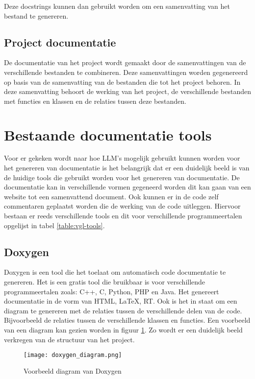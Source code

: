 Deze docstrings kunnen dan gebruikt worden om een samenvatting van het bestand te genereren.

\subsection{Project documentatie}
\label{sec:project-documentatie-literatuur}
De documentatie van het project wordt gemaakt door de samenvattingen van de verschillende bestanden te combineren.
Deze samenvattingen worden gegenereerd op basis van de samenvatting van de bestanden die tot het project behoren.
In deze samenvatting behoort de werking van het project, de verschillende bestanden met functies en klassen en de relaties tussen deze bestanden.


\section{Bestaande documentatie tools}
\label{sec:huidige-tools}
Voor er gekeken wordt naar hoe LLM's mogelijk gebruikt kunnen worden voor het genereren van documentatie is het belangrijk dat er een duidelijk beeld is van de huidige tools die gebruikt worden voor het genereren van documentatie.
De documentatie kan in verschillende vormen gegeneerd worden dit kan gaan van een website tot een samenvattend document.
Ook kunnen er in de code zelf commentaren geplaatst worden die de werking van de code uitleggen.
Hiervoor bestaan er reeds verschillende tools en dit voor verschillende programmeertalen opgelijst in tabel \ref{table:vgl-tools}.

\subsection{Doxygen}
Doxygen \autocite{Doxygen2023} is een tool die het toelaat om automatisch code documentatie te genereren. Het is een gratis tool die bruikbaar is voor verschillende programmeertalen zoals: C++, C, Python, PHP en Java.
Het genereert documentatie in de vorm van HTML, LaTeX, RT. Ook is het in staat om een diagram te genereren met de relaties tussen de verschillende delen van de code. 
Bijvoorbeeld de relaties tussen de verschillende klassen en functies.
Een voorbeeld van een diagram kan gezien worden in figuur \ref{fig:Doxygen-diagram}.
Zo wordt er een duidelijk beeld verkregen van de structuur van het project.

\begin{figure}[h]
  \centering
  \texttt{[image: doxygen\_diagram.png]}
  \caption{Voorbeeld diagram van Doxygen \autocite{Doxygen2023}}
  \label{fig:Doxygen-diagram}
\end{figure}

